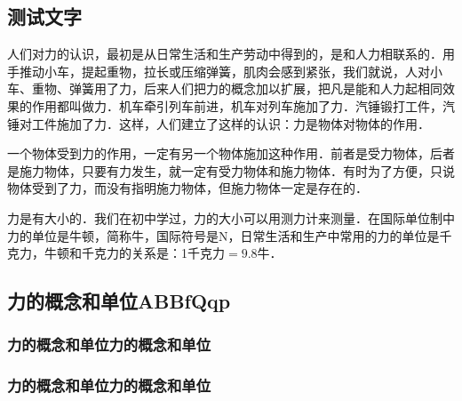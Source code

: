 \makeatother








\begin{Point}
\lipsum[2]
\end{Point}

\begin{Case}
\item\lipsum[1][1]
\item\lipsum[1][1]
\item\lipsum[1][1]
\item\lipsum[1][1]
\end{Case}




\subsection{测试文字}




人们对力的认识，最初是从日常生活和生产劳动中得到的，是和人力相联系的．用手推动小车，提起重物，拉长或压缩弹簧，肌肉会感到紧张，我们就说，人对小车、重物、弹簧用了力，后来人们把力的概念加以扩展，把凡是能和人力起相同效果的作用都叫做力．机车牵引列车前进，机车对列车施加了力．汽锤锻打工件，汽锤对工件施加了力．这样，人们建立了这样的认识：\textsf{力是物体对物体的作用}．

一个物体受到力的作用，一定有另一个物体施加这种作用．前者是受力物体，后者是施力物体，只要有力发生，就一定有受力物体和施力物体．有时为了方便，只说物体受到了力，而没有指明施力物体，但施力物体一定是存在的．

力是有大小的．我们在初中学过，力的大小可以用测力计来测量．在国际单位制中力的单位是\textsf{牛顿}，简称牛，国际符号是N，日常生活和生产中常用的力的单位是千克力，牛顿和千克力的关系是：1千克力$=9.8$牛．



\subsection{力的概念和单位ABBfQqp}

\subsubsection{力的概念和单位力的概念和单位}

\subsubsection*{力的概念和单位力的概念和单位}

